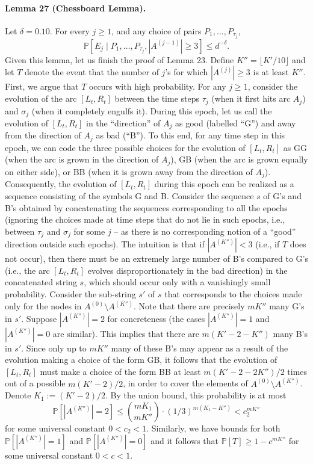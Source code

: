 \documentclass[10pt,a4paper]{article}
\begin{document}
\paragraph{Lemma 27 (Chessboard Lemma).} Let $\delta=0.10$. For every $j\geq1$, and any choice of pairs $P_1,\ldots,P_{\tau_j}$,
\[\mathbb P[E_j\mid P_1,\ldots,P_{\tau_j},|A^{(j-1)}|\geq3]\leq d^{-\delta}.\]
Given this lemma, let us finish the proof of Lemma 23. Define $K''=\lfloor K'/10\rfloor$ and let $T$ denote the event that the number of $j$'s for which $|A^{(j)}|\geq3$ is at least $K''$. First, we argue that $T$ occurs with high probability.
For any $j\geq1$, consider the evolution of the arc $[L_t,R_t]$ between the time steps $\tau_j$ (when it first hits arc $A_j$) and $\sigma_j$ (when it completely engulfs it). During this epoch, let us call the evolution of $[L_t,R_t]$ in the ``direction'' of $A_j$ as good (labelled ``G'') and away from the direction of $A_j$ as bad (``B''). To this end, for any time step in this epoch, we can code the three possible choices for the evolution of $[L_t,R_t]$ as GG (when the arc is grown in the direction of $A_j$), GB (when the arc is grown equally on either side), or BB (when it is grown away from the direction of $A_j$). Consequently, the evolution of $[L_t,R_t]$ during this epoch can be realized as a sequence consisting of the symbols G and B.
Consider the sequence $s$ of G's and B's obtained by concatenating the sequences corresponding to all the epochs (ignoring the choices made at time steps that do not lie in such epochs, i.e., between $\tau_j$ and $\sigma_j$ for some $j$ -- as there is no corresponding notion of a ``good'' direction outside such epochs). The intuition is that if $|A^{(K'')}|<3$ (i.e., if $T$ does not occur), then there must be an extremely large number of B's compared to G's (i.e., the arc $[L_t,R_t]$ evolves disproportionately in the bad direction) in the concatenated string $s$, which should occur only with a vanishingly small probability.
Consider the sub-string $s'$ of $s$ that corresponds to the choices made only for the nodes in $A^{(0)}\setminus A^{(K'')}$. Note that there are precisely $mK''$ many G's in $s'$. Suppose $|A^{(K'')}|=2$ for concreteness (the cases $|A^{(K'')}|=1$ and $|A^{(K'')}|=0$ are similar). This implies that there are $m(K'-2-K'')$ many B's in $s'$. Since only up to $mK''$ many of these B's may appear as a result of the evolution making a choice of the form GB, it follows that the evolution of $[L_t,R_t]$ must make a choice of the form BB at least $m(K'-2-2K'')/2$ times out of a possible $m(K'-2)/2$, in order to cover the elements of $A^{(0)}\setminus A^{(K'')}$. Denote $K_1:=(K'-2)/2$. By the union bound, this probability is at most
\[\mathbb P[|A^{(K'')}|=2]\leq\binom{mK_1}{mK''}\cdot(1/3)^{m(K_1-K'')}<c_2^{mK''}\]
for some universal constant $0<c_2<1$. Similarly, we have bounds for both $\mathbb P[|A^{(K'')}|=1]$ and $\mathbb P[|A^{(K'')}|=0]$ and it follows that $\mathbb P[T]\geq1-c^{mK''}$ for some universal constant $0<c<1$.
\end{document}
